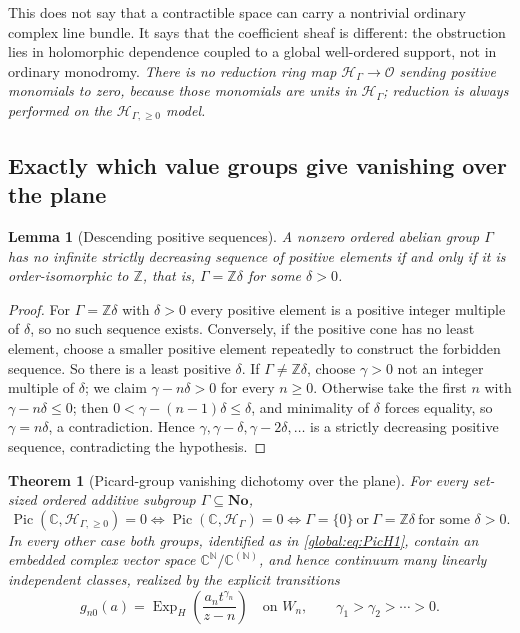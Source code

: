 \documentclass[11pt,letterpaper]{article}
\newtheorem{theorem}{Theorem}[section]
\newtheorem{lemma}[lemma]{Lemma}
\theoremstyle{definition}
\theoremstyle{remark}
\newcommand{\No}{\mathbf{No}}
\newcommand{\C}{\mathbb C}
\newcommand{\N}{\mathbb N}
\newcommand{\Z}{\mathbb Z}
\newcommand{\OO}{\mathcal O}
\newcommand{\HH}{\mathscr H_\Gamma}
\newcommand{\HI}{\mathscr H_{\Gamma,\ge0}}
\newcommand{\Pic}{\operatorname{Pic}}
\newcommand{\ExpH}{\operatorname{Exp}_{H}}
\numberwithin{equation}{section}
\begin{document}
This does not say that a contractible space can carry a nontrivial ordinary complex line bundle. It says that the coefficient sheaf is different: the obstruction lies in holomorphic dependence coupled to a global well-ordered support, not in ordinary monodromy. \emph{There is no reduction ring map $\HH\to\OO$ sending positive monomials to zero, because those monomials are units in $\HH$; reduction is always performed on the $\HI$ model.}

\subsection{Exactly which value groups give vanishing over the plane}

\begin{lemma}[Descending positive sequences]\label{global:lem:descending}
A nonzero ordered abelian group $\Gamma$ has no infinite strictly decreasing sequence of positive elements if and only if it is order-isomorphic to $\Z$, that is, $\Gamma=\Z\delta$ for some $\delta>0$.
\end{lemma}

\begin{proof}
For $\Gamma=\Z\delta$ with $\delta>0$ every positive element is a positive integer multiple of $\delta$, so no such sequence exists. Conversely, if the positive cone has no least element, choose a smaller positive element repeatedly to construct the forbidden sequence. So there is a least positive $\delta$. If $\Gamma\ne\Z\delta$, choose $\gamma>0$ not an integer multiple of $\delta$; we claim $\gamma-n\delta>0$ for every $n\ge0$. Otherwise take the first $n$ with $\gamma-n\delta\le0$; then $0<\gamma-(n-1)\delta\le\delta$, and minimality of $\delta$ forces equality, so $\gamma=n\delta$, a contradiction. Hence $\gamma,\gamma-\delta,\gamma-2\delta,\dots$ is a strictly decreasing positive sequence, contradicting the hypothesis.
\end{proof}

\begin{theorem}[Picard-group vanishing dichotomy over the plane]\label{global:thm:dichotomy}
For every set-sized ordered additive subgroup $\Gamma\subseteq\No$,
\begin{equation}\label{global:eq:dichotomy}
  \Pic(\C,\HI)=0
  \iff
  \Pic(\C,\HH)=0
  \iff
  \Gamma=\{0\}\ \text{or}\ \Gamma=\Z\delta\ \text{for some }\delta>0 .
\end{equation}
In every other case both groups, identified as in \eqref{global:eq:PicH1}, contain an embedded complex vector space $\C^\N/\C^{(\N)}$, and hence continuum many linearly independent classes, realized by the explicit transitions
\begin{equation}\label{global:eq:explicitbundles}
  g_{n0}(a)=\ExpH\!\left(\frac{a_nt^{\gamma_n}}{z-n}\right)
  \quad\text{on }W_n,
  \qquad \gamma_1>\gamma_2>\cdots>0 .
\end{equation}
\end{theorem}
\end{document}

